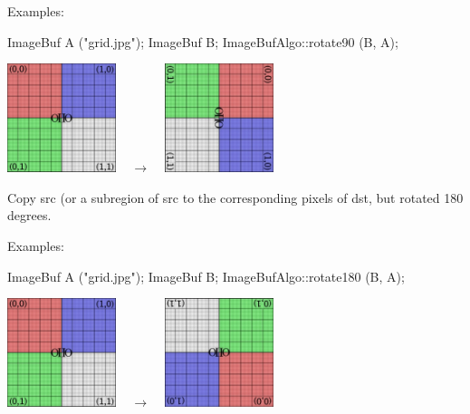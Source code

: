 \smallskip
\noindent Examples:
\begin{code}
    ImageBuf A ("grid.jpg");
    ImageBuf B;
    ImageBufAlgo::rotate90 (B, A);
\end{code}
\spc \includegraphics[width=1.25in]{figures/grid-small.jpg}
~ {\Huge $\rightarrow$} ~
\includegraphics[width=1.25in]{figures/rotate90.jpg} \\
\apiend


 
Copy {\cf src} (or a subregion of {\cf src} to the corresponding pixels
of {\cf dst}, but rotated 180 degrees.

\smallskip
\noindent Examples:
\begin{code}
    ImageBuf A ("grid.jpg");
    ImageBuf B;
    ImageBufAlgo::rotate180 (B, A);
\end{code}
\spc \includegraphics[width=1.25in]{figures/grid-small.jpg}
~ {\Huge $\rightarrow$} ~
\includegraphics[width=1.25in]{figures/rotate180.jpg} \\
\apiend



